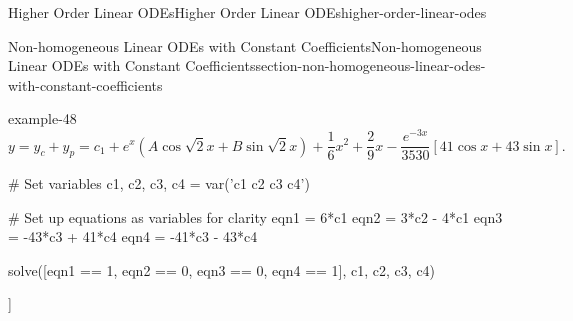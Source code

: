 \documentclass[oneside,10pt,]{book}
\numberwithin{equation}{section}
\newcommand{\brackets}[1]{\left[ #1 \right]}
\begin{document}
\begin{chapterptx}{Higher Order Linear ODEs}{}{Higher Order Linear ODEs}{}{}{higher-order-linear-odes}
\begin{sectionptx}{Non-homogeneous Linear ODEs with Constant Coefficients}{}{Non-homogeneous Linear ODEs with Constant Coefficients}{}{}{section-non-homogeneous-linear-odes-with-constant-coefficients}
\begin{example}{}{example-48}
\begin{equation*}
y = y_{c}+y_{p} = c_{1}+e^{x}(A\cos\sqrt{2}x+B\sin\sqrt{2}x) +\frac{1}{6}x^{2}+\frac{2}{9}x-\frac{e^{-3x}}{3530}\brackets{41\cos x+43\sin x}.
\end{equation*}
%
\end{example}
\begin{sageinput}
# Set variables
c1, c2, c3, c4 = var('c1 c2 c3 c4')

# Set up equations as variables for clarity
eqn1 = 6*c1
eqn2 = 3*c2 - 4*c1
eqn3 = -43*c3 + 41*c4
eqn4 = -41*c3 - 43*c4

solve([eqn1 == 1, eqn2 == 0, eqn3 == 0, eqn4 == 1], c1, c2, c3, c4)
\end{sageinput}
\begin{sageoutput}
[[c1 == (1/6), c2 == (2/9), c3 == (-41/3530), c4 == (-43/3530)]]
\end{sageoutput}
\end{sectionptx}
\end{chapterptx}
%
%
\typeout{************************************************}
\typeout{************************************************}
%
\end{document}
